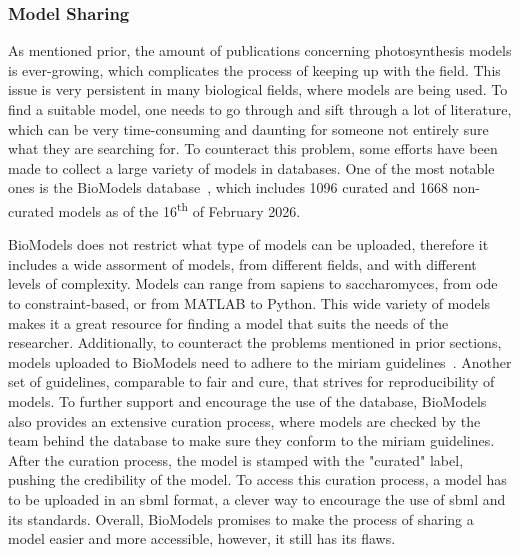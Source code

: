 \subsubsection{Model Sharing}\label{sec:intro-model-sharing}

As mentioned prior, the amount of publications concerning photosynthesis models is ever-growing, which complicates the process of keeping up with the field. This issue is very persistent in many biological fields, where models are being used. To find a suitable model, one needs to go through and sift through a lot of literature, which can be very time-consuming and daunting for someone not entirely sure what they are searching for. To counteract this problem, some efforts have been made to collect a large variety of models in databases. One of the most notable ones is the BioModels database~\cite{malik-sheriffBioModels15Years2019}, which includes 1096 curated and 1668 non-curated models as of the 16\textsuperscript{th} of February 2026.

BioModels does not restrict what type of models can be uploaded, therefore it includes a wide assorment of models, from different fields, and with different levels of complexity. Models can range from \gls{sapiens} to \gls{saccharomyces}, from \gls{ode} to constraint-based, or from MATLAB to Python. This wide variety of models makes it a great resource for finding a model that suits the needs of the researcher. Additionally, to counteract the problems mentioned in prior sections, models uploaded to BioModels need to adhere to the \gls{miriam} guidelines~\cite{novereMinimumInformationRequested2005}. Another set of guidelines, comparable to \gls{fair} and \gls{cure}, that strives for reproducibility of models. To further support and encourage the use of the database, BioModels also provides an extensive curation process, where models are checked by the team behind the database to make sure they conform to the \gls{miriam} guidelines. After the curation process, the model is stamped with the "curated" label, pushing the credibility of the model. To access this curation process, a model has to be uploaded in an \gls{sbml} format, a clever way to encourage the use of \gls{sbml} and its standards. Overall, BioModels promises to make the process of sharing a model easier and more accessible, however, it still has its flaws.

